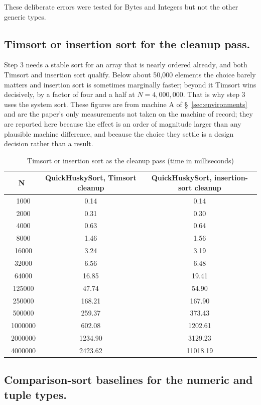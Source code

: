\documentclass[twoside,leqno,twocolumn]{article}
\begin{document}
These deliberate errors were tested for Bytes and Integers but not the other generic types.

\subsection{Timsort or insertion sort for the cleanup pass.}
\label{sec:cleanup-choice}

Step 3 needs a stable sort for an array that is nearly ordered already, and both Timsort and insertion
sort qualify.
Below about 50,000 elements the choice barely matters and insertion sort is sometimes marginally
faster; beyond it Timsort wins decisively, by a factor of four and a half at $N = 4{,}000{,}000$.
That is why step 3 uses the system sort.
These figures are from machine A of \S~\ref{sec:environments} and are the paper's only measurements not
taken on the machine of record; they are reported here because the effect is an order of magnitude
larger than any plausible machine difference, and because the choice they settle is a design decision
rather than a result.

\begin{table}
  \caption{Timsort or insertion sort as the cleanup pass (time in milliseconds)}
  \label{tab:TimvsInsertion}
  \begin{tabular}{ccc}
    \toprule
    N & QuickHuskySort, Timsort cleanup & QuickHuskySort, insertion-sort cleanup \\
    \midrule
    \ 1000&0.14&0.14 \\
\ 2000&0.31&0.30 \\
\ 4000&0.63&0.64 \\
\ 8000&1.46&1.56 \\
\ 16000&3.24&3.19 \\
\ 32000&6.56&6.48 \\
\ 64000&16.85&19.41 \\
\ 125000&47.74&54.90 \\
\ 250000&168.21&167.90 \\
\ 500000&259.37&373.43 \\
\ 1000000&602.08&1202.61 \\
\ 2000000&1234.90&3129.23 \\
\ 4000000&2423.62&11018.19 \\

    \bottomrule
  \end{tabular}
\end{table}

\subsection{Comparison-sort baselines for the numeric and tuple types.}
\label{sec:comparison-baselines}
\end{document}
